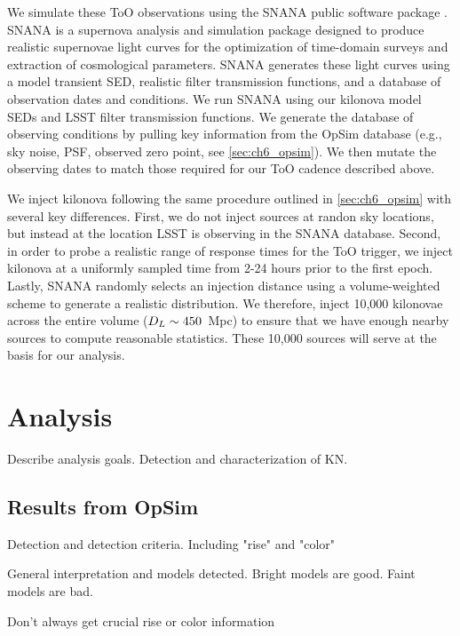 We simulate these ToO observations using the SNANA public software package \citep{SNANA}. SNANA is a supernova analysis and simulation package designed to produce realistic supernovae light curves for the optimization of time-domain surveys and extraction of cosmological parameters. SNANA generates these light curves using a model transient SED, realistic filter transmission functions, and a database of observation dates and conditions. We run SNANA using our kilonova model SEDs and LSST filter transmission functions. We generate the database of observing conditions by pulling key information from the OpSim database (e.g., sky noise, PSF, observed zero point, see \cref{sec:ch6_opsim}). We then mutate the observing dates to match those required for our ToO cadence described above.

We inject kilonova following the same procedure outlined in \cref{sec:ch6_opsim} with several key differences. First, we do not inject sources at randon sky locations, but instead at the location LSST is observing in the SNANA database. Second, in order to probe a realistic range of response times for the ToO trigger, we inject kilonova at a uniformly sampled time from 2-24 hours prior to the first epoch. Lastly, SNANA randomly selects an injection distance using a volume-weighted scheme to generate a realistic distribution. We therefore, inject 10,000 kilonovae across the entire volume ($D_L \sim 450$~Mpc) to ensure that we have enough nearby sources to compute reasonable statistics. These 10,000 sources will serve at the basis for our analysis.

\section{Analysis}
\label{sec:ch6_analysis}
Describe analysis goals. Detection and characterization of KN. 

\subsection{Results from OpSim}
\label{sec:ch6_opsim_results}
Detection and detection criteria. Including "rise" and "color"

General interpretation and models detected. Bright models are good. Faint models are bad. 

Don't always get crucial rise or color information

